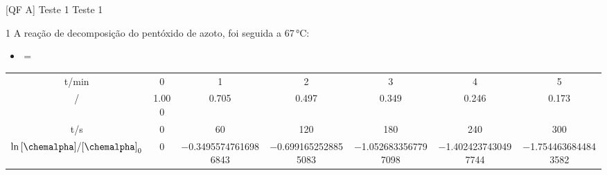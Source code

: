 \documentclass[\mainfilename]{subfiles}
\begin{document}
\graphicspath{{\subfix{./.build/figures/QF_A-Testes_Resoluções.2023.1.1}}}

[QF A]
{Teste 1} %
{Teste 1} %

\begin{questionBox}1{ %
    A reação de decomposição do pentóxido de azoto,  foi seguida a 67\,\unit{\celsius}:
} %
    \begin{itemize}
        \item {}\,=\,\chemalpha
    \end{itemize}

    \begin{center}
        \setlength\tabcolsep{1.5mm}        %
        \renewcommand\arraystretch{1.25} %
        \begin{tabular}{c *{6}{c}}
            
            \\\toprule
            
                \multicolumn{1}{c}{t/\unit{\minute}}
                & 0 & 1 & 2 & 3 & 4 & 5
                \\
                \multicolumn{1}{c}{\ch{[\chemalpha]}/\unit{\M}}
                & 1.000 & 0.705 & 0.497 & 0.349 & 0.246 & 0.173
            
            \\\midrule
            
                \multicolumn{1}{c}{t/\unit{\second}}
                & 0
                & 60
                & 120
                & 180
                & 240
                & 300
                \\
                \multicolumn{1}{c}{\(\ln{{[\chemalpha]}/{[\chemalpha]}_0}\)}
                & 0
                & \num{-0.34955747616986843}
                & \num{-0.6991652528855083}
                & \num{-1.0526833567797098}
                & \num{-1.4024237430497744}
                & \num{-1.7544636844843582}


\end{tabular}
\end{center}
\end{questionBox}
\end{document}
